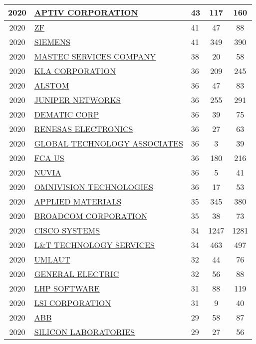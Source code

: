 \documentclass{article}%
\begin{document}
\begin{longtable}{c|p{20em}|p{5em}|c|c}
\hline%
2020&\hyperref[subsec:APTIVCORPORATION]{APTIV CORPORATION}&43&117&160\\%
\hline%
2020&\hyperref[subsec:ZF]{ZF}&41&47&88\\%
\hline%
2020&\hyperref[subsec:SIEMENS]{SIEMENS}&41&349&390\\%
\hline%
2020&\hyperref[subsec:MASTECSERVICESCOMPANY]{MASTEC SERVICES COMPANY}&38&20&58\\%
\hline%
2020&\hyperref[subsec:KLACORPORATION]{KLA CORPORATION}&36&209&245\\%
\hline%
2020&\hyperref[subsec:ALSTOM]{ALSTOM}&36&47&83\\%
\hline%
2020&\hyperref[subsec:JUNIPERNETWORKS]{JUNIPER NETWORKS}&36&255&291\\%
\hline%
2020&\hyperref[subsec:DEMATICCORP]{DEMATIC CORP}&36&39&75\\%
\hline%
2020&\hyperref[subsec:RENESASELECTRONICS]{RENESAS ELECTRONICS}&36&27&63\\%
\hline%
2020&\hyperref[subsec:GLOBALTECHNOLOGYASSOCIATES]{GLOBAL TECHNOLOGY ASSOCIATES}&36&3&39\\%
\hline%
2020&\hyperref[subsec:FCAUS]{FCA US}&36&180&216\\%
\hline%
2020&\hyperref[subsec:NUVIA]{NUVIA}&36&5&41\\%
\hline%
2020&\hyperref[subsec:OMNIVISIONTECHNOLOGIES]{OMNIVISION TECHNOLOGIES}&36&17&53\\%
\hline%
2020&\hyperref[subsec:APPLIEDMATERIALS]{APPLIED MATERIALS}&35&345&380\\%
\hline%
2020&\hyperref[subsec:BROADCOMCORPORATION]{BROADCOM CORPORATION}&35&38&73\\%
\hline%
2020&\hyperref[subsec:CISCOSYSTEMS]{CISCO SYSTEMS}&34&1247&1281\\%
\hline%
2020&\hyperref[subsec:LTTECHNOLOGYSERVICES]{L\&T TECHNOLOGY SERVICES}&34&463&497\\%
\hline%
2020&\hyperref[subsec:UMLAUT]{UMLAUT}&32&44&76\\%
\hline%
2020&\hyperref[subsec:GENERALELECTRIC]{GENERAL ELECTRIC}&32&56&88\\%
\hline%
2020&\hyperref[subsec:LHPSOFTWARE]{LHP SOFTWARE}&31&88&119\\%
\hline%
2020&\hyperref[subsec:LSICORPORATION]{LSI CORPORATION}&31&9&40\\%
\hline%
2020&\hyperref[subsec:ABB]{ABB}&29&58&87\\%
\hline%
2020&\hyperref[subsec:SILICONLABORATORIES]{SILICON LABORATORIES}&29&27&56\\%

\end{longtable}
\end{document}
